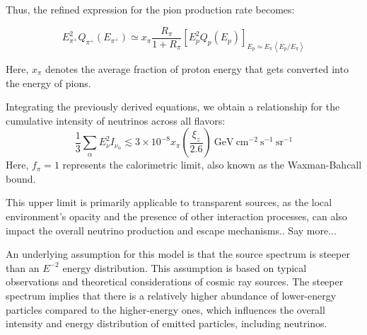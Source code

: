 Thus, the refined expression for the pion production rate becomes:
%
\begin{remark}
\[
E^2_{\pi^+} Q_{\pi^+} (E_{\pi^+}) \simeq x_{\pi} \frac{R_{\pi}}{1 + R_{\pi}}  \left[E^2_p Q_p(E_p) \right]_{E_p \simeq E_{\pi} \left\langle {E_p}/{E_{\pi}} \right\rangle}
\]
\end{remark}

Here, \(x_{\pi}\) denotes the average fraction of proton energy that gets converted into the energy of pions.

Integrating the previously derived equations, we obtain a relationship for the cumulative intensity of neutrinos across all flavors:
\[
\frac{1}{3} \sum_\alpha E_\nu^2 I_{\nu_\alpha} \lesssim 3 \times 10^{-8} x_\pi \left( \frac{\xi_z}{2.6} \right)~\text{GeV}~\text{cm}^{-2}~\text{s}^{-1}~\text{sr}^{-1}
\]
Here, \( f_\pi = 1 \) represents the calorimetric limit, also known as the Waxman-Bahcall bound. 

This upper limit is primarily applicable to transparent sources, as the local environment's opacity and the presence of other interaction processes, can also impact the overall neutrino production and escape mechanisms.. {\color{red}Say more...}

%

An underlying assumption for this model is that the source spectrum is steeper than an \(E^{-2}\) energy distribution. This assumption is based on typical observations and theoretical considerations of cosmic ray sources. The steeper spectrum implies that there is a relatively higher abundance of lower-energy particles compared to the higher-energy ones, which influences the overall intensity and energy distribution of emitted particles, including neutrinos.

